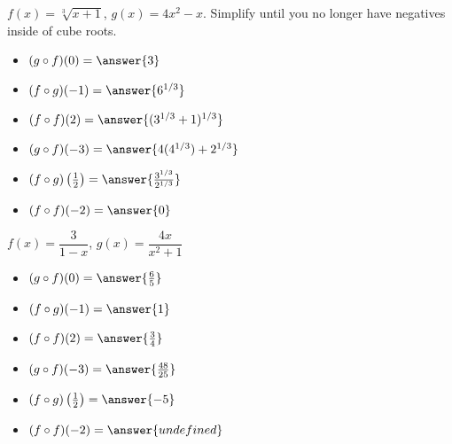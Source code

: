 \documentclass{ximera}
\begin{document}
\begin{exercise}
 $f(x) = \sqrt[3]{x+1}$, $g(x) = 4x^2-x$. Simplify until you no longer have negatives inside of cube roots.
\begin{itemize}
\item  $(g\circ f)(0)=\answer{3}$
\item  $(f\circ g)(-1)=\answer{6^{1/3}}$
\item  $(f \circ f)(2)=\answer{(3^{1/3}+1)^{1/3}}$
\item  $(g\circ f)(-3)=\answer{4(4^{1/3})+2^{1/3}}$
\item  $(f\circ g)\left(\frac{1}{2}\right)=\answer{\frac{3^{1/3}}{2^{1/3}}}$
\item  $(f \circ f)(-2)=\answer{0}$
\end{itemize}
\end{exercise}


\begin{exercise}
$f(x) = \dfrac{3}{1-x}$, $g(x) = \dfrac{4x}{x^2+1}$
\begin{itemize}
\item  $(g\circ f)(0)=\answer{\frac{6}{5}}$
\item  $(f\circ g)(-1)=\answer{1}$
\item  $(f \circ f)(2)=\answer{\frac{3}{4}}$
\item  $(g\circ f)(-3)=\answer{\frac{48}{25}}$
\item  $(f\circ g)\left(\frac{1}{2}\right)=\answer{-5}$
\item  $(f \circ f)(-2)=\answer{undefined}$
\end{itemize}
\end{exercise}
\end{document}
